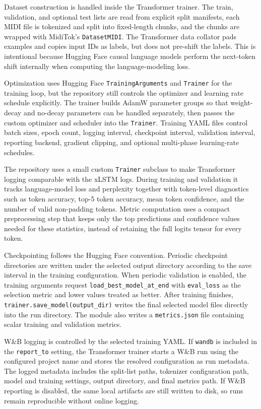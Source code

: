 Dataset construction is handled inside the Transformer trainer. The train,
validation, and optional test lists are read from explicit split manifests, each
MIDI file is tokenized and split into fixed-length chunks, and the chunks are
wrapped with MidiTok's \verb|DatasetMIDI|. The Transformer data collator pads
examples and copies input IDs as labels, but does not pre-shift the labels.
This is intentional because Hugging Face causal language models perform the
next-token shift internally when computing the language-modeling loss.

Optimization uses Hugging Face \verb|TrainingArguments| and \verb|Trainer| for
the training loop, but the repository still controls the optimizer and learning
rate schedule explicitly. The trainer builds AdamW parameter groups so that
weight-decay and no-decay parameters can be handled separately, then passes the
custom optimizer and scheduler into the \verb|Trainer|. Training YAML files
control batch sizes, epoch count, logging interval, checkpoint interval,
validation interval, reporting backend, gradient clipping, and optional
multi-phase learning-rate schedules.

The repository uses a small custom \verb|Trainer| subclass to make Transformer
logging comparable with the xLSTM logs. During training and validation it tracks
language-model loss and perplexity together with token-level diagnostics such as
token accuracy, top-5 token accuracy, mean token confidence, and the number of
valid non-padding tokens. Metric computation uses a compact preprocessing step
that keeps only the top predictions and confidence values needed for these
statistics, instead of retaining the full logits tensor for every token.

Checkpointing follows the Hugging Face convention. Periodic checkpoint
directories are written under the selected output directory according to the
save interval in the training configuration. When periodic validation is
enabled, the training arguments request \verb|load_best_model_at_end| with
\verb|eval_loss| as the selection metric and lower values treated as better.
After training finishes, \verb|trainer.save_model(output_dir)| writes the final
selected model files directly into the run directory. The module also writes a
\verb|metrics.json| file containing scalar training and validation metrics.

W\&B logging is controlled by the selected training YAML. If \verb|wandb| is
included in the \verb|report_to| setting, the Transformer trainer starts a W\&B
run using the configured project name and stores the resolved configuration as
run metadata. The logged metadata includes the split-list paths, tokenizer
configuration path, model and training settings, output directory, and final
metrics path. If W\&B reporting is disabled, the same local artifacts are still
written to disk, so runs remain reproducible without online logging.

